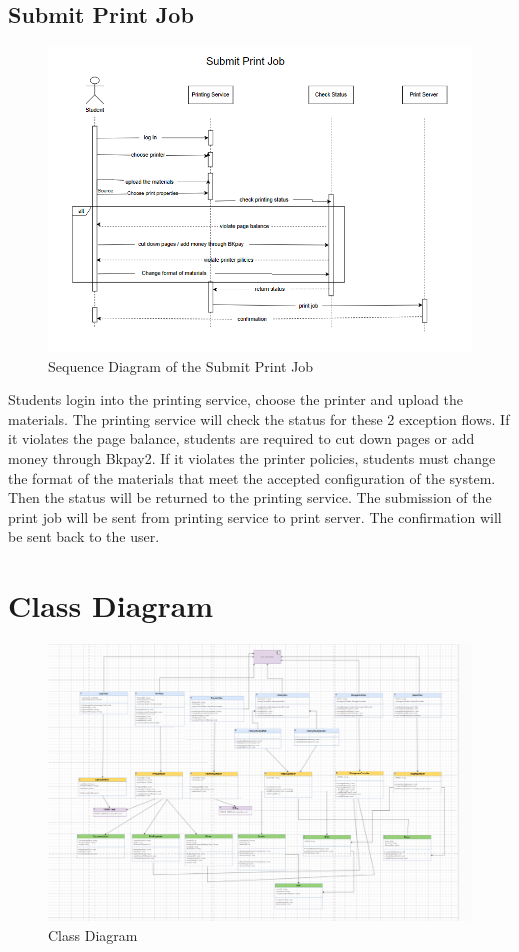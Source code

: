 \subsection{Submit Print Job}
\begin{figure}[H]
\centering
  \includegraphics[max width=0.9\linewidth,origin = c]{chapters/4. system-modeling/picture/SubmitPrint.png}
  \caption{Sequence Diagram of the Submit Print Job}%
\end{figure}
Students login into the printing service, choose the printer and upload the materials. The printing service will check the status for these 2 exception flows. If it violates the page balance, students are required to cut down pages or add money through Bkpay2. If it violates the printer policies, students must change the format of the materials that meet the accepted configuration of the system. Then the status will be returned to the printing service. The submission of the print job will be sent from printing service to print server. The confirmation will be sent back to the user.

\section{Class Diagram}
\begin{figure}[H]
  \includegraphics[max width=0.9\linewidth,origin = c]{chapters/4. system-modeling/picture/class.PNG}
  \caption{Class Diagram}%
\end{figure}


